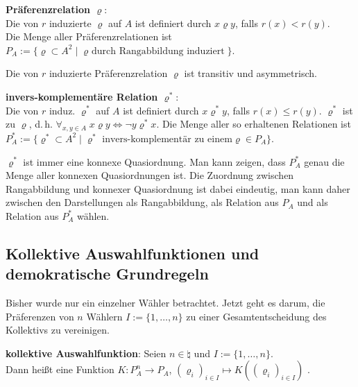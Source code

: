\textbf{Präferenzrelation $\varrho$}:\\
Die von $r$ induzierte  $\varrho$ auf $A$
ist definiert durch $x\varrho y$, falls $r(x) < r(y)$.\\
Die Menge aller Präferenzrelationen ist
$P_A := \{\varrho \subset A^2 \;|\; \text{$\varrho$ durch Rangabbildung induziert}\}$.

Die von $r$ induzierte Präferenzrelation $\varrho$ ist transitiv und asymmetrisch.

\linie

\textbf{invers-komplementäre Relation $\varrho^\ast$}:\\
Die von $r$ induz.  $\varrho^\ast$ auf $A$
ist definiert durch $x\varrho^\ast y$, falls $r(x) \le r(y)$.
$\varrho^\ast$ ist  zu $\varrho$, d.\,h.
$\forall_{x, y \in A}\; x\varrho y \iff \lnot y\varrho^\ast x$.
Die Menge aller so erhaltenen Relationen ist
$P_A^\ast := \{\varrho^\ast \subset A^2 \;|\; \text{$\varrho^\ast$ invers-komplementär zu einem
$\varrho \in P_A$}\}$.

$\varrho^\ast$ ist immer eine konnexe Quasiordnung.
Man kann zeigen, dass $P_A^\ast$ genau die Menge aller konnexen Quasiordnungen ist.
Die Zuordnung zwischen Rangabbildung und konnexer Quasiordnung ist dabei eindeutig,
man kann daher zwischen den Darstellungen als Rangabbildung, als Relation aus $P_A$ und als
Relation aus $P_A^\ast$ wählen.

\pagebreak

\subsection{%
    Kollektive Auswahlfunktionen und demokratische Grundregeln%
}

Bisher wurde nur ein einzelner Wähler betrachtet.
Jetzt geht es darum, die Präferenzen von $n$ Wählern
$I := \{1, \dotsc, n\}$ zu einer Gesamtentscheidung des Kollektivs zu vereinigen.

\textbf{kollektive Auswahlfunktion}:
Seien $n \in \natural$ und $I := \{1, \dotsc, n\}$.\\
Dann heißt eine Funktion $K\colon P_A^n \to P_A$,
$(\varrho_i)_{i \in I} \mapsto K((\varrho_i)_{i \in I})$ .

